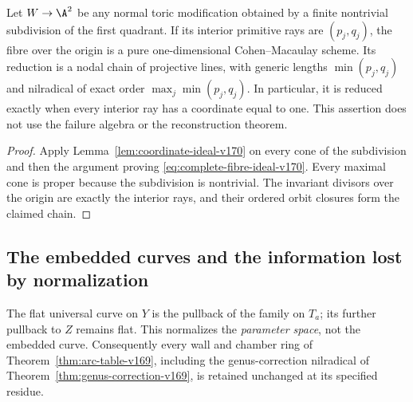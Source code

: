 \begin{corollary}
\label{cor:toric-fibres-v170}
Let $W\to\A^2$ be any normal toric modification obtained by a finite
nontrivial subdivision of the first quadrant. If its interior
primitive rays are $(p_j,q_j)$, the fibre over the origin is a pure
one-dimensional Cohen--Macaulay scheme. Its reduction is a nodal
chain of projective lines, with generic lengths $\min(p_j,q_j)$
and nilradical of exact order $\max_j\min(p_j,q_j)$. In particular,
it is reduced exactly when every interior ray has a coordinate equal
to one. This assertion does not use the failure algebra or the
reconstruction theorem.
\end{corollary}
\begin{proof}
Apply Lemma~\ref{lem:coordinate-ideal-v170} on every cone of the
subdivision and then the argument proving
\eqref{eq:complete-fibre-ideal-v170}. Every maximal cone is proper
because the subdivision is nontrivial. The invariant divisors over
the origin are exactly the interior rays, and their ordered orbit
closures form the claimed chain.
\end{proof}

\subsection{The embedded curves and the information lost by normalization}
The flat universal curve on $Y$ is the pullback of the family on
$T_a$; its further pullback to $Z$ remains flat. This normalizes the
\emph{parameter space}, not the embedded curve. Consequently every
wall and chamber ring of Theorem~\ref{thm:arc-table-v169}, including
the genus-correction nilradical of
Theorem~\ref{thm:genus-correction-v169}, is retained unchanged at its
specified residue.

